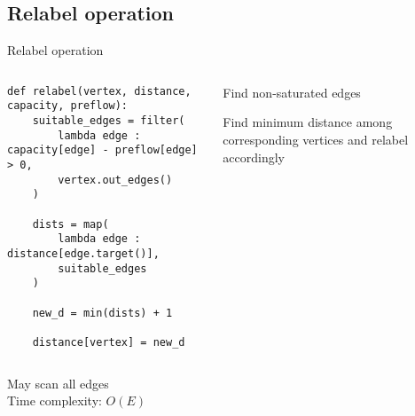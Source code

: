 \documentclass{beamer}
\begin{document}
\subsection{Relabel operation}
\begin{frame}[fragile]{Relabel operation}
    \begin{columns}[T]
        \begin{column}{0.50\textwidth}
            \begin{lstlisting}
def relabel(vertex, distance, capacity, preflow):
    suitable_edges = filter(
        lambda edge : capacity[edge] - preflow[edge] > 0,
        vertex.out_edges()
    )

    dists = map(
        lambda edge : distance[edge.target()],
        suitable_edges
    )

    new_d = min(dists) + 1

    distance[vertex] = new_d
            \end{lstlisting}
        \end{column}

        \begin{column}{0.50\textwidth}
            \begin{sidecomment}
                \pause
                \vskip 33bp
                Find non-saturated edges

                \pause
                \vskip 23bp
                Find minimum distance among corresponding vertices and relabel accordingly
            \end{sidecomment}
        \end{column}
    \end{columns}

    \pause
    \vspace*{\fill}
    May scan all edges
    \\Time complexity: $O(E)$
\end{frame}
\end{document}
